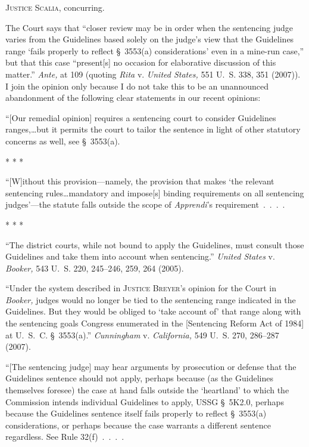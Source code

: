 
\setcounter{page}{112}

  \textsc{Justice Scalia,} concurring.

  The Court says that ``closer review may be in order when the
sentencing judge varies from the Guidelines based solely on the
judge's view that the Guidelines range ‘fails properly to reflect
\S~3553(a) considerations' even in a mine-run case,'' but that
this case ``present[s] no occasion for elaborative discussion of this
matter.'' \emph{Ante,} at 109 (quoting \emph{Rita} v. \emph{United States,}
551 U.~S. 338, 351 (2007)). I join the opinion only because I do
not take this to be an unannounced abandonment of the following clear
statements in our recent opinions:

    ``[Our remedial opinion] requires a sentencing court to consider
    Guidelines ranges,\dots but it permits the court to tailor
    the sentence in light of other statutory concerns as well, see
    \S~3553(a).

    * * *

    ``[W]ithout this provision---namely, the provision that makes
    ‘the relevant sentencing rules\dots mandatory and impose[s]
    binding requirements on all sentencing judges'---the statute falls
    outside the scope of \emph{Apprendi}'s requirement~.~.~.~.

    * * *

    ``The district courts, while not bound to apply the Guidelines,
    must consult those Guidelines and take them into account when
    sentencing.'' \emph{United States} v. \emph{Booker,} 543 U.~S. 220,
    245--246, 259, 264 (2005).

      ``Under the system described in \textsc{Justice Breyer'}s opinion
    for the Court in \emph{Booker,} judges would no longer be tied to
    the sentencing range indicated in the Guidelines. But they would
    be obliged to ‘take account of' that range along with the
    sentencing goals Congress enumerated in the [Sentencing Reform Act
    of 1984] at  U.~S.~C. \S~3553(a).'' \emph{Cunningham}
    v. \emph{California,} 549 U.~S. 270, 286--287 (2007).

    ``[The sentencing judge] may hear arguments by prosecution or
    defense that the Guidelines sentence should not apply, perhaps
    because (as the Guidelines themselves foresee) the case at hand
    falls outside the ‘heartland' to which the Commission intends
    individual Guidelines to apply, USSG \S~5K2.0, perhaps because the
    Guidelines sentence itself fails properly to reflect \S~3553(a)
    considerations, or perhaps because the case warrants a different
    sentence regardless. See Rule 32(f)~.~.~.~.

